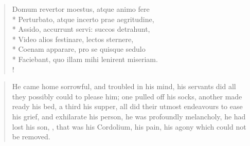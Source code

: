 {\begin{latin}
\begin{verse}%
Domum revertor moestus, atque animo fere\\*
Perturbato, atque incerto prae aegritudine,\\*
Assido, accurrunt servi: succos detrahunt,\\*
Video alios festinare, lectos sternere,\\*
Coenam apparare, pro se quisque sedulo\\*
Faciebant, quo illam mihi lenirent miseriam.\\!
\end{verse}%
\end{latin}
\translationrule%
\begin{verse}%
He came home sorrowful, and troubled in his mind,
his servants did all they possibly could to please him;
one pulled off his socks, another made ready his bed,
a third his supper, all did their utmost endeavours
to ease his grief, and exhilarate his person,
he was profoundly melancholy, he had lost his son,
, that was his Cordolium,
his pain, his agony which could not be removed.
\end{verse}%

}
